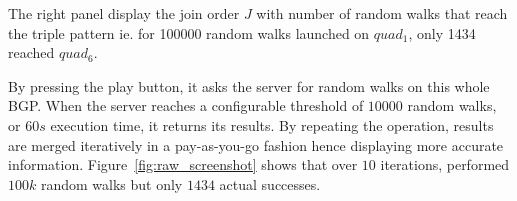  The right panel display the join order $J$ with number of random
 walks that reach the triple pattern ie. for 100000 random walks
 launched on $quad_1$, only 1434 reached $quad_6$.

 By pressing the play button, it asks the server for random walks on
 this whole BGP. When the server reaches a configurable threshold of
 $10 000$ random walks, or $60s$ execution time, it returns its
 results. By repeating the operation, results are merged iteratively
 in a pay-as-you-go fashion hence displaying more accurate
 information. Figure~\ref{fig:raw_screenshot} shows that over $10$
 iterations, \NAME performed $100k$ random walks but only $1434$
 actual successes.





